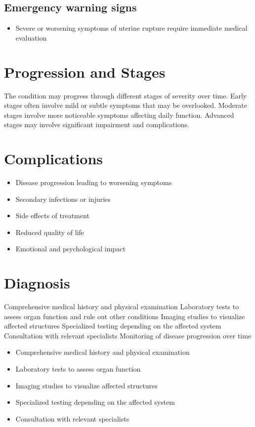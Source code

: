 \subsection{Emergency warning signs}
\begin{itemize}[noitemsep]
  \item Severe or worsening symptoms of uterine rupture require immediate medical evaluation
\end{itemize}
\section{Progression and Stages}
The condition may progress through different stages of severity over time. Early stages often involve mild or subtle symptoms that may be overlooked. Moderate stages involve more noticeable symptoms affecting daily function. Advanced stages may involve significant impairment and complications.
\section{Complications}
\begin{itemize}[noitemsep]
  \item Disease progression leading to worsening symptoms
  \item Secondary infections or injuries
  \item Side effects of treatment
  \item Reduced quality of life
  \item Emotional and psychological impact
\end{itemize}
\section{Diagnosis}
Comprehensive medical history and physical examination Laboratory tests to assess organ function and rule out other conditions Imaging studies to visualize affected structures Specialized testing depending on the affected system Consultation with relevant specialists Monitoring of disease progression over time

\begin{itemize}[noitemsep]
  \item Comprehensive medical history and physical examination
  \item Laboratory tests to assess organ function
  \item Imaging studies to visualize affected structures
  \item Specialized testing depending on the affected system
  \item Consultation with relevant specialists
\end{itemize}
